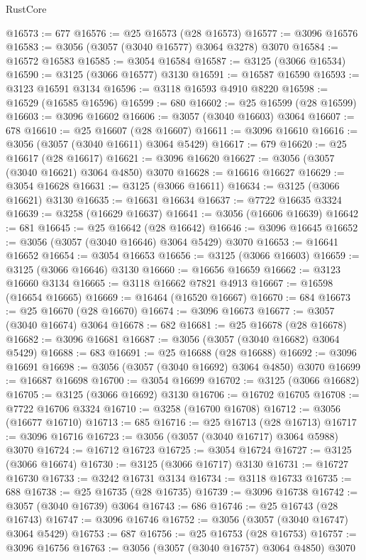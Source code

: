 \begin{lexlean}{RustCore}
\begin{coremodule}
@16573 := 677
@16576 := @25 @16573 (@28 @16573)
@16577 := @3096 @16576
@16583 := @3056 (@3057 (@3040 @16577) @3064 @3278) @3070
@16584 := @16572 @16583
@16585 := @3054 @16584
@16587 := @3125 (@3066 @16534)
@16590 := @3125 (@3066 @16577) @3130
@16591 := @16587 @16590
@16593 := @3123 @16591 @3134
@16596 := @3118 @16593 @4910 @8220
@16598 := @16529 (@16585 @16596)
@16599 := 680
@16602 := @25 @16599 (@28 @16599)
@16603 := @3096 @16602
@16606 := @3057 (@3040 @16603) @3064
@16607 := 678
@16610 := @25 @16607 (@28 @16607)
@16611 := @3096 @16610
@16616 := @3056 (@3057 (@3040 @16611) @3064 @5429)
@16617 := 679
@16620 := @25 @16617 (@28 @16617)
@16621 := @3096 @16620
@16627 := @3056 (@3057 (@3040 @16621) @3064 @4850) @3070
@16628 := @16616 @16627
@16629 := @3054 @16628
@16631 := @3125 (@3066 @16611)
@16634 := @3125 (@3066 @16621) @3130
@16635 := @16631 @16634
@16637 := @7722 @16635 @3324
@16639 := @3258 (@16629 @16637)
@16641 := @3056 (@16606 @16639)
@16642 := 681
@16645 := @25 @16642 (@28 @16642)
@16646 := @3096 @16645
@16652 := @3056 (@3057 (@3040 @16646) @3064 @5429) @3070
@16653 := @16641 @16652
@16654 := @3054 @16653
@16656 := @3125 (@3066 @16603)
@16659 := @3125 (@3066 @16646) @3130
@16660 := @16656 @16659
@16662 := @3123 @16660 @3134
@16665 := @3118 @16662 @7821 @4913
@16667 := @16598 (@16654 @16665)
@16669 := @16464 (@16520 @16667)
@16670 := 684
@16673 := @25 @16670 (@28 @16670)
@16674 := @3096 @16673
@16677 := @3057 (@3040 @16674) @3064
@16678 := 682
@16681 := @25 @16678 (@28 @16678)
@16682 := @3096 @16681
@16687 := @3056 (@3057 (@3040 @16682) @3064 @5429)
@16688 := 683
@16691 := @25 @16688 (@28 @16688)
@16692 := @3096 @16691
@16698 := @3056 (@3057 (@3040 @16692) @3064 @4850) @3070
@16699 := @16687 @16698
@16700 := @3054 @16699
@16702 := @3125 (@3066 @16682)
@16705 := @3125 (@3066 @16692) @3130
@16706 := @16702 @16705
@16708 := @7722 @16706 @3324
@16710 := @3258 (@16700 @16708)
@16712 := @3056 (@16677 @16710)
@16713 := 685
@16716 := @25 @16713 (@28 @16713)
@16717 := @3096 @16716
@16723 := @3056 (@3057 (@3040 @16717) @3064 @5988) @3070
@16724 := @16712 @16723
@16725 := @3054 @16724
@16727 := @3125 (@3066 @16674)
@16730 := @3125 (@3066 @16717) @3130
@16731 := @16727 @16730
@16733 := @3242 @16731 @3134
@16734 := @3118 @16733
@16735 := 688
@16738 := @25 @16735 (@28 @16735)
@16739 := @3096 @16738
@16742 := @3057 (@3040 @16739) @3064
@16743 := 686
@16746 := @25 @16743 (@28 @16743)
@16747 := @3096 @16746
@16752 := @3056 (@3057 (@3040 @16747) @3064 @5429)
@16753 := 687
@16756 := @25 @16753 (@28 @16753)
@16757 := @3096 @16756
@16763 := @3056 (@3057 (@3040 @16757) @3064 @4850) @3070

\end{coremodule}
\end{lexlean}
